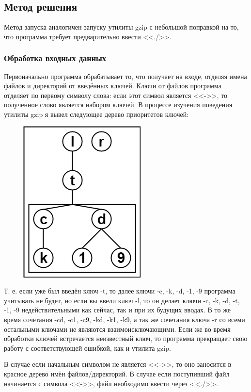 \documentclass[12pt]{article}
\begin{document}
\subsection*{Метод решения}

Метод запуска аналогичен запуску утилиты gzip с небольшой поправкой на то, что программа требует предварительно ввести <<./>>.

\subsubsection*{Обработка входных данных}

Первоначально программа обрабатывает то, что получает на входе, отделяя имена файлов и директорий от введённых ключей. Ключи от файлов программа отделяет по первому символу слова: если этот символ является <<->>, то полученное слово является набором ключей. В процессе изучения поведения утилиты gzip я вывел следующее дерево приоритетов ключей:

\begin{figure}[h!]
	\centering\includegraphics[scale=0.5]{KeyTree}
\end{figure}

Т. е. если уже был введён ключ -t, то далее ключи -c, -k, -d, -1, -9 программа учитывать не будет, но если вы ввели ключ -l, то он делает ключи -c, -k, -d, -t, -1, -9 недействительными как сейчас, так и при их будущих вводах. В то же время сочетания -cd, -c1, -c9, -kd, -k1, -k9, а так же сочетания ключа -r со всеми остальными ключами не являются взаимоисключающими. Если же во время обработки ключей встречается неизвестный ключ, то программа прекращает свою работу с соответствующей ошибкой, как и утилита gzip.

В случае если начальным символом не является <<->>, то оно заносится в красное дерево имён файлов/директорий. В случае если поступивший файл начинается с символа <<->>, файл необходимо ввести через <<./>>.
\end{document}
